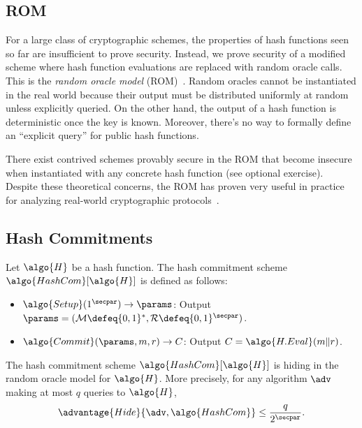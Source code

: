 \subsection{ROM}

  For a large class of cryptographic schemes, the properties of hash functions seen so far are insufficient to prove security.
  Instead, we prove security of a modified scheme where hash function evaluations are replaced with random oracle calls.
  This is the \emph{random oracle model} (ROM)~\cite{CCS:BelRog93}.
  Random oracles cannot be instantiated in the real world because their output must be distributed uniformly at random unless explicitly queried.
  On the other hand, the output of a hash function is deterministic once the key is known.
  Moreover, there's no way to formally define an ``explicit query'' for public hash functions.

  There exist contrived schemes provably secure in the ROM that become insecure when instantiated with any concrete hash function (see optional exercise).
  Despite these theoretical concerns, the ROM has proven very useful in practice for analyzing real-world cryptographic protocols~\cite{DCC:KobMen15}.

\subsection{Hash Commitments}

\begin{definition}
  Let $\algo{H}$ be a hash function.
  The hash commitment scheme $\algo{HashCom}[\algo{H}]$ is defined as follows:
  \begin{itemize}
    \item $\algo{Setup}(1^\secpar) \rightarrow \params$: Output $\params = (\mathcal{M} \defeq \{0, 1\}^*, \mathcal{R} \defeq \{0, 1\}^\secpar)$.
    \item $\algo{Commit}(\params, m, r) \rightarrow C$: Output $C = \algo{H.Eval}(m \| r)$.
  \end{itemize}
\end{definition}

\begin{lemma}\label{lem:hash-com-hiding}
  The hash commitment scheme $\algo{HashCom}[\algo{H}]$ is hiding in the random oracle model for $\algo{H}$.
  More precisely, for any algorithm $\adv$ making at most $q$ queries to $\algo{H}$,
  \[
  \advantage{Hide}{\adv, \algo{HashCom}} \leq \frac{q}{2^\secpar}.
  \]
\end{lemma}

